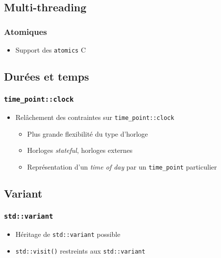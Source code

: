 \documentclass[C++.tex]{subfiles}
\begin{document}
\subsection*{Multi-threading}
\begin{frame}[fragile]
	\frametitle{Atomiques}
	\begin{itemize}
		\item Support des \lstinline|atomics| C
	\end{itemize}
\end{frame}

\subsection*{Durées et temps}
\begin{frame}[fragile]
	\frametitle{\lstinline|time_point::clock|}
	\begin{itemize}
		\item Relâchement des contraintes sur \lstinline|time_point::clock|
		\begin{itemize}
			\item Plus grande flexibilité du type d'horloge
			\item Horloges \textit{stateful}, horloges externes
			\item Représentation d'un \textit{time of day} par un \lstinline|time_point| particulier
		\end{itemize}
	\end{itemize}
\end{frame}

\subsection*{Variant}
\begin{frame}[fragile]
	\frametitle{\lstinline|std::variant|}
	\begin{itemize}
		\item Héritage de \lstinline|std::variant| possible
		\item \lstinline|std::visit()| restreints aux \lstinline|std::variant|

	\end{itemize}
\end{frame}
\end{document}
